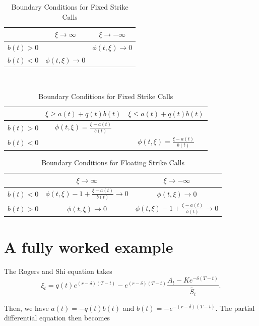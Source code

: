\documentclass[12pt]{report}
\begin{document}
\begin{table}[H]
  \begin{tabular}{|c|c|c|}
    \hline
    & \(\xi \rightarrow \infty\) & \(\xi \rightarrow -\infty\) \\
    \hline
    \(b(t) > 0\) &  & \(\phi(t, \xi) \rightarrow 0\) \\
    \(b(t) < 0\) & \(\phi(t, \xi) \rightarrow 0\) & \\
    \hline
  \end{tabular}\\
  \begin{tabular}{|c|c|c|}
    \hline
    & \(\xi \ge a(t) + q(t)b(t)\) & \(\xi \le a(t) + q(t)b(t)\) \\
    \hline
    \(b(t) > 0\) & \(\phi(t, \xi) = \frac{\xi-a(t)}{b(t)} \) & \\
    \(b(t) < 0\) &  & \( \phi(t, \xi) = \frac{\xi-a(t)}{b(t)} \) \\
    \hline
  \end{tabular}
  \caption{Boundary Conditions for Fixed Strike Calls}
\end{table}

\begin{table}[H]
  \begin{tabular}{|c|c|c|}
    \hline
      & \(\xi \rightarrow \infty\) & \(\xi \rightarrow -\infty\) \\
    \hline
      \(b(t) < 0\) & \(\phi(t, \xi) - 1 + \frac{\xi - a(t)}{b(t)} \rightarrow 0\) & \(\phi(t, \xi) \rightarrow 0\)\\
      \(b(t) > 0\) & \(\phi(t, \xi) \rightarrow 0\) & \(\phi(t, \xi) - 1 + \frac{\xi - a(t)}{b(t)} \rightarrow 0\)\\
    \hline
  \end{tabular}
  \caption{Boundary Conditions for Floating Strike Calls}
\end{table}

\section{A fully worked example}
The Rogers and Shi equation takes
\begin{equation}
  \xi_t = q(t)e^{(r-\delta)(T-t)} - e^{(r-\delta)(T-t)}\frac{A_t - Ke^{-\delta(T-t)}}{\tilde{S_t}}.
\end{equation}

Then, we have \( a(t) = -q(t)b(t) \) and \(b(t) = -e^{-(r-\delta)(T-t)}\). The partial differential equation then becomes
\end{document}
